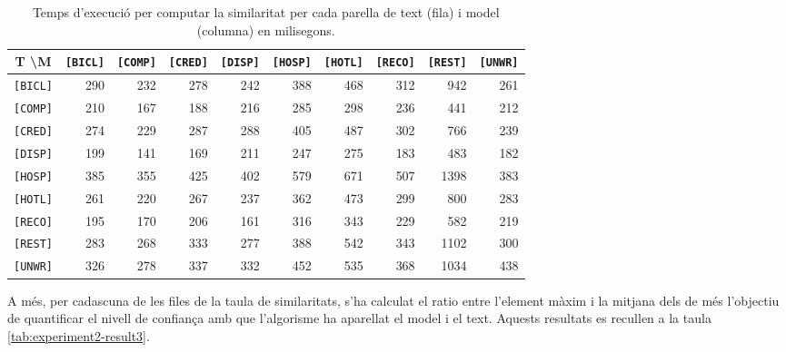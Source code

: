 \begin{table}[htbp]
\begin{tabular}{l||r|r|r|r|r|r|r|r|r||}
    \multicolumn{1}{c||}{T \textbackslash M} & \multicolumn{1}{l|}{\texttt{[BICL]}} & \multicolumn{1}{l|}{\texttt{[COMP]}} & \multicolumn{1}{l|}{\texttt{[CRED]}} & \multicolumn{1}{l|}{\texttt{[DISP]}} & \multicolumn{1}{l|}{\texttt{[HOSP]}} & \multicolumn{1}{l|}{\texttt{[HOTL]}} & \multicolumn{1}{l|}{\texttt{[RECO]}} & \multicolumn{1}{l|}{\texttt{[REST]}} & \multicolumn{1}{l||}{\texttt{[UNWR]}} \\ \hline\hline
\texttt{[BICL]} & 290 & 232 & 278 & 242 & 388 & 468 & 312 & 942 & 261 \\ \hline
\texttt{[COMP]} & 210 & 167 & 188 & 216 & 285 & 298 & 236 & 441 & 212 \\ \hline
\texttt{[CRED]} & 274 & 229 & 287 & 288 & 405 & 487 & 302 & 766 & 239 \\ \hline
\texttt{[DISP]} & 199 & 141 & 169 & 211 & 247 & 275 & 183 & 483 & 182 \\ \hline
\texttt{[HOSP]} & 385 & 355 & 425 & 402 & 579 & 671 & 507 & 1398 & 383 \\ \hline
\texttt{[HOTL]} & 261 & 220 & 267 & 237 & 362 & 473 & 299 & 800 & 283 \\ \hline
\texttt{[RECO]} & 195 & 170 & 206 & 161 & 316 & 343 & 229 & 582 & 219 \\ \hline
\texttt{[REST]} & 283 & 268 & 333 & 277 & 388 & 542 & 343 & 1102 & 300 \\ \hline
\texttt{[UNWR]} & 326 & 278 & 337 & 332 & 452 & 535 & 368 & 1034 & 438 \\ \hline\hline
\end{tabular}
\caption{Temps d'execució per computar la similaritat per cada parella de text (fila) i model (columna) en milisegons.}
\label{tab:experiment2-result2}
\end{table}

A més, per cadascuna de les files de la taula de similaritats, s'ha calculat el ratio entre l'element màxim i la mitjana dels de més l'objectiu de quantificar el nivell de confiança amb que l'algorisme ha aparellat el model i el text. Aquests resultats es recullen a la taula \ref{tab:experiment2-result3}.

